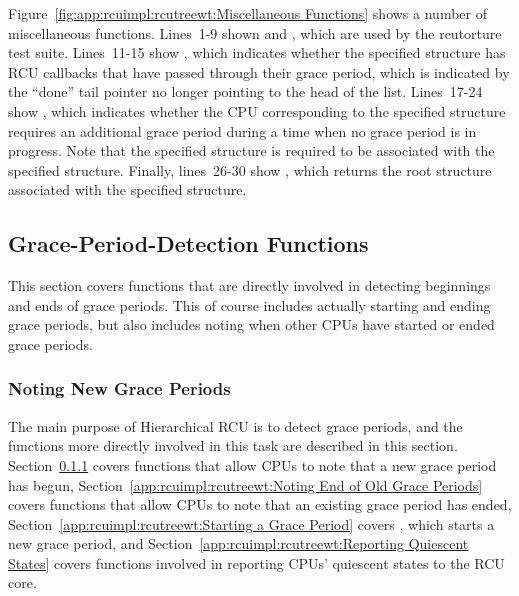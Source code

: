Figure~\ref{fig:app:rcuimpl:rcutreewt:Miscellaneous Functions}
shows a number of miscellaneous functions.
Lines~1-9 shown  and
, which are used by the rcutorture
test suite.
Lines~11-15 show , which
indicates whether the specified  structure has RCU
callbacks that have passed through their grace period, which
is indicated by the ``done'' tail pointer no longer pointing
to the head of the list.
Lines~17-24 show , which indicates
whether the CPU corresponding to the specified 
structure requires an additional grace period during a time when
no grace period is in progress.
Note that the specified  structure is required
to be associated with the specified  structure.
Finally, lines~26-30 show , which returns
the root  structure associated with the specified
 structure.

\subsection{Grace-Period-Detection Functions}
\label{app:rcuimpl:rcutreewt:Grace-Period-Detection Functions}

This section covers functions that are directly involved in detecting
beginnings and ends of grace periods.
This of course includes actually starting and ending grace periods,
but also includes noting when other CPUs have started or ended
grace periods.

\subsubsection{Noting New Grace Periods}
\label{app:rcuimpl:rcutreewt:Noting New Grace Periods}

The main purpose of Hierarchical RCU is to detect grace periods,
and the functions more directly involved in this task are described
in this section.
Section~\ref{app:rcuimpl:rcutreewt:Noting New Grace Periods}
covers functions that allow CPUs to note that a new grace period has
begun,
Section~\ref{app:rcuimpl:rcutreewt:Noting End of Old Grace Periods}
covers functions that allow CPUs to note that an existing grace period
has ended,
Section~\ref{app:rcuimpl:rcutreewt:Starting a Grace Period}
covers , which starts a new grace period, and
Section~\ref{app:rcuimpl:rcutreewt:Reporting Quiescent States}
covers functions involved in reporting CPUs' quiescent states to
the RCU core.

